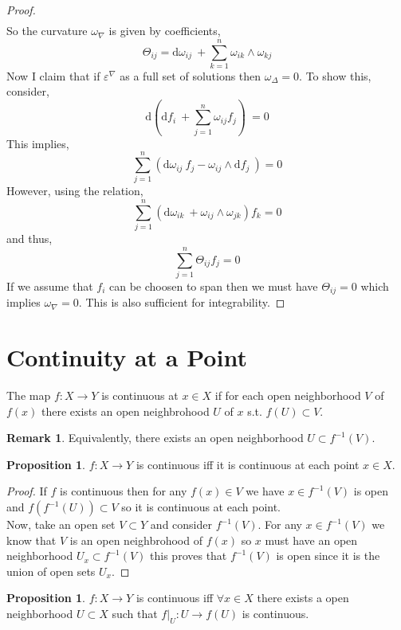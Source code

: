 \documentclass[12pt]{extarticle}
\renewcommand{\d}[1]{ \mathrm{d}#1 \:}
\theoremstyle{definition}
\newtheorem{proposition}[theorem]{Proposition}
\newtheorem{remark}{Remark}
\newenvironment{definition}[1][Definition:]{\begin{trivlist}
\item[\hskip \labelsep {\bfseries #1}]}{\end{trivlist}}
\begin{document}
\begin{proof}
\begin{align*}
\end{align*}
So the curvature $\omega_\nabla$ is given by coefficients,
\[ \Theta_{ij} = \d{\omega_{ij}} + \sum_{k = 1}^n \omega_{ik} \wedge \omega_{kj} \]
Now I claim that if $\varepsilon^{\nabla}$ as a full set of solutions then $\omega_\Delta = 0$. To show this, consider,
\[ \d{\left( \d{f_i} + \sum_{j = 1}^n \omega_{ij} f_j \right)} = 0 \]
This implies,
\[ \sum_{j = 1}^n \left( \d{\omega_{ij}} f_j - \omega_{ij} \wedge \d{f_j} \right) = 0 \]
However, using the relation,
\[ \sum_{j = 1}^n \left( \d{\omega_{ik}} + \omega_{ij} \wedge \omega_{jk} \right) f_k = 0 \]
and thus,
\[ \sum_{j = 1}^n \Theta_{ij} f_j = 0 \]
If we assume that $f_i$ can be choosen to span then we must have $\Theta_{ij} = 0$ which implies $\omega_\nabla = 0$. This is also sufficient for integrability. 
\end{proof}

\section{Continuity at a Point}

\begin{definition}
The map $f : X \to Y$ is continuous at $x \in X$ if for each open neighborhood $V$ of $f(x)$ there exists an open neighbrohood $U$ of $x$ s.t. $f(U) \subset V$.
\end{definition}

\begin{remark}
Equivalently, there exists an open neighborhood $U \subset f^{-1}(V)$. 
\end{remark}

\begin{proposition}
$f : X \to Y$ is continuous iff it is continuous at each point $x \in X$.
\end{proposition}

\begin{proof}
If $f$ is continuous then for any $f(x) \in V$ we have $x \in f^{-1}(V)$ is open and $f(f^{-1}(U)) \subset V$ so it is continuous at each point. 
\bigskip\\
Now, take an open set $V \subset Y$ and consider $f^{-1}(V)$. For any $x \in f^{-1}(V)$ we know that $V$ is an open neighbrohood of $f(x)$ so $x$ must have an open neighborhood $U_x \subset f^{-1}(V)$ this proves that $f^{-1}(V)$ is open since it is the union of open sets $U_x$. 
\end{proof}

\begin{proposition}
$f : X \to Y$ is continuous iff $\forall x \in X$ there exists a open neighborhood $U \subset X$ such that $f|_U : U \to f(U)$ is continuous. 
\end{proposition}
\end{document}
